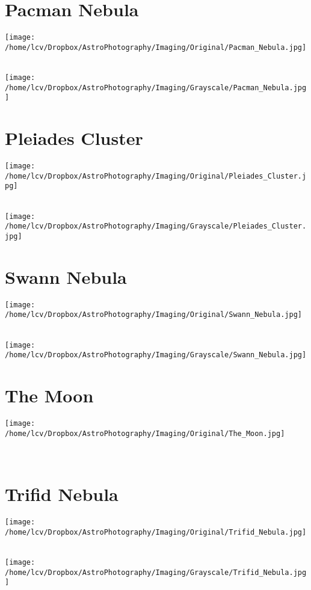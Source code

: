 \section{Pacman Nebula}
\texttt{[image: /home/lcv/Dropbox/AstroPhotography/Imaging/Original/Pacman\_Nebula.jpg]}
{\footnotesize\color{white}

}\ \\
\texttt{[image: /home/lcv/Dropbox/AstroPhotography/Imaging/Grayscale/Pacman\_Nebula.jpg]}
\begin{center}
\end{center}
\section{Pleiades Cluster}
\texttt{[image: /home/lcv/Dropbox/AstroPhotography/Imaging/Original/Pleiades\_Cluster.jpg]}
{\footnotesize\color{white}

}\ \\
\texttt{[image: /home/lcv/Dropbox/AstroPhotography/Imaging/Grayscale/Pleiades\_Cluster.jpg]}
\begin{center}
\end{center}
\section{Swann Nebula}
\texttt{[image: /home/lcv/Dropbox/AstroPhotography/Imaging/Original/Swann\_Nebula.jpg]}
{\footnotesize\color{white}

}\ \\
\texttt{[image: /home/lcv/Dropbox/AstroPhotography/Imaging/Grayscale/Swann\_Nebula.jpg]}
\begin{center}
\end{center}
\section{The Moon}
\texttt{[image: /home/lcv/Dropbox/AstroPhotography/Imaging/Original/The\_Moon.jpg]}
{\footnotesize\color{white}

}\ \\
\begin{center}
\end{center}
\section{Trifid Nebula}
\texttt{[image: /home/lcv/Dropbox/AstroPhotography/Imaging/Original/Trifid\_Nebula.jpg]}
{\footnotesize\color{white}

}\ \\
\texttt{[image: /home/lcv/Dropbox/AstroPhotography/Imaging/Grayscale/Trifid\_Nebula.jpg]}
\begin{center}
\end{center}
